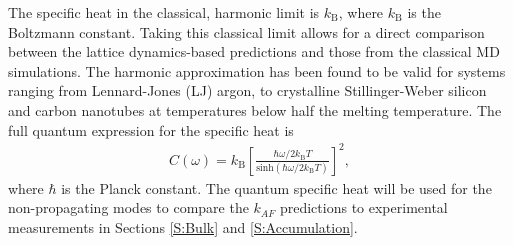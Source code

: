 The specific heat in the classical, harmonic limit is 
$k_{\text{B}}$, where $k_{\text{B}}$ is the Boltzmann constant.
\cite{mcquarrie_statistical_2000}
Taking this classical limit allows for a direct 
comparison between the lattice dynamics-based 
predictions and those from the classical MD simulations. 
The harmonic approximation has been found to be valid 
for systems ranging from 
Lennard-Jones (LJ) argon,\cite{mcgaughey_quantitative_2004} 
to crystalline Stillinger-Weber silicon 
and carbon nanotubes\cite{larkin_comparison_2012} at temperatures 
below half the melting temperature. 
The full quantum expression for the specific heat is
\cite{ziman_electrons_2001}
\begin{equation}\label{EQ:Cquantum}
\begin{split}
C(\omega) = k_{\text{B}}\left[\frac{\hbar\omega/2k_{\text{B}}T}
{\text{sinh}(\hbar\omega/2k_{\text{B}}T)}\right]^2,
\end{split}
\end{equation} 
where $\hbar$ is the Planck constant.\cite{ashcroft_solid_1976} 
The quantum specific heat will be used for the 
non-propagating modes to compare the $k_{AF}$ predictions 
to experimental measurements in Sections \ref{S:Bulk} 
and \ref{S:Accumulation}. 

